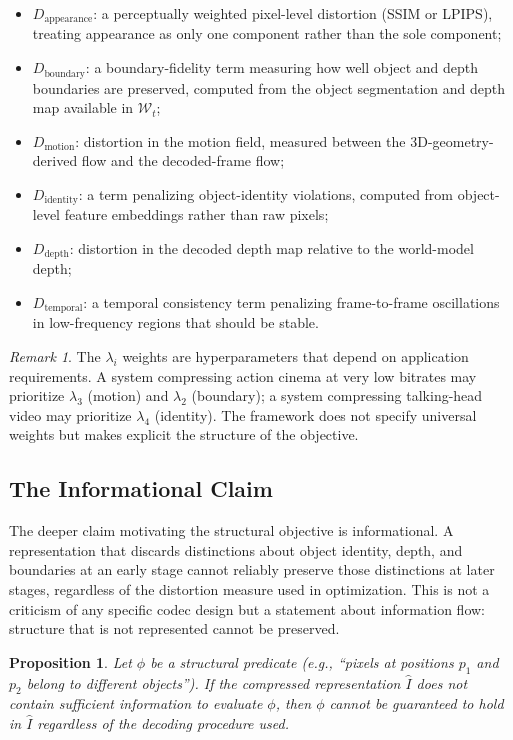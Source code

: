 \documentclass[11pt,a4paper]{article}
\theoremstyle{plain}
\newtheorem{proposition}[theorem]{Proposition}
\theoremstyle{definition}
\theoremstyle{remark}
\newtheorem{remark}[theorem]{Remark}
\begin{document}
\begin{itemize}[leftmargin=2em,itemsep=2pt]
\item $D_{\mathrm{appearance}}$: a perceptually weighted pixel-level distortion (SSIM \cite{wang2004ssim} or LPIPS), treating appearance as only one component rather than the sole component;
\item $D_{\mathrm{boundary}}$: a boundary-fidelity term measuring how well object and depth boundaries are preserved, computed from the object segmentation and depth map available in $\mathcal{W}_t$;
\item $D_{\mathrm{motion}}$: distortion in the motion field, measured between the 3D-geometry-derived flow and the decoded-frame flow;
\item $D_{\mathrm{identity}}$: a term penalizing object-identity violations, computed from object-level feature embeddings rather than raw pixels;
\item $D_{\mathrm{depth}}$: distortion in the decoded depth map relative to the world-model depth;
\item $D_{\mathrm{temporal}}$: a temporal consistency term penalizing frame-to-frame oscillations in low-frequency regions that should be stable.
\end{itemize}

\begin{remark}
The $\lambda_i$ weights are hyperparameters that depend on application requirements. A system compressing action cinema at very low bitrates may prioritize $\lambda_3$ (motion) and $\lambda_2$ (boundary); a system compressing talking-head video may prioritize $\lambda_4$ (identity). The framework does not specify universal weights but makes explicit the structure of the objective.
\end{remark}

\subsection{The Informational Claim}

The deeper claim motivating the structural objective is informational. A representation that discards distinctions about object identity, depth, and boundaries at an early stage cannot reliably preserve those distinctions at later stages, regardless of the distortion measure used in optimization. This is not a criticism of any specific codec design but a statement about information flow: structure that is not represented cannot be preserved.

\begin{proposition}
\label{prop:infoclaim}
Let $\phi$ be a structural predicate (e.g., ``pixels at positions $p_1$ and $p_2$ belong to different objects''). If the compressed representation $\hat{I}$ does not contain sufficient information to evaluate $\phi$, then $\phi$ cannot be guaranteed to hold in $\hat{I}$ regardless of the decoding procedure used.
\end{proposition}
\end{document}
